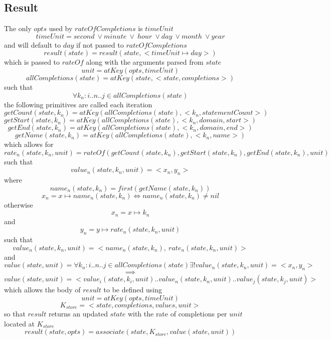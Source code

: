 \documentclass[../main.tex]{subfiles}
\begin{document}
\subsection{Result}
The only $opts$ used by $rateOfCompletions$ is $timeUnit$
$$timeUnit = second \ \lor minute \ \lor \ hour \ \lor day \ \lor month \ \lor year$$
and will default to $day$ if not passed to $rateOfCompletions$
$$result(state) = result(state, <timeUnit \mapsto day>)$$
which is passed to $rateOf$ along with the arguments parsed from $state$
$$unit = atKey(opts, timeUnit)$$
$$allCompletions(state) = atKey(state, <state, completions>)$$
such that
$$\forall k_{n} : i..n..j \in allCompletions(state)$$
the following primitives are called each iteration
$$getCount(state, k_{n}) = atKey(allCompletions(state), <k_{n}, statementCount>)$$
$$getStart(state, k_{n}) = atKey(allCompletions(state), <k_{n}, domain, start>)$$
$$getEnd(state, k_{n}) = atKey(allCompletions(state), <k_{n}, domain, end>)$$
$$getName(state, k_{n}) = atKey(allCompletions(state), <k_{n}, name>) $$
which allows for
$$rate_{n}(state, k_{n}, unit) = rateOf(getCount(state, k_{n}), getStart(state, k_{n}), getEnd(state, k_{n}), unit)$$
such that
$$value_{n}(state, k_{n}, unit) = <x_{n}, y_{n}>$$
where
$$name_{n}(state, k_{n}) = first(getName(state, k_{n}))$$
$$x_{n} = x \mapsto name_{n}(state, k_{n}) \iff name_{n}(state, k_{n}) \not = nil$$
otherwise
$$x_{n} = x \mapsto k_{n}$$
and
$$y_{n} = y \mapsto rate_{n}(state, k_{n}, unit)$$
such that
$$value_{n}(state, k_{n}, unit) = <name_{n}(state, k_{n}), \ rate_{n}(state, k_{n}, unit)>$$
and
$$value(state, unit) = \forall k_{n} : i..n..j \in allCompletions(state) \exists! value_{n}(state, k_{n}, unit) = <x_{n}, y_{n}>$$
$$\implies$$
$$value(state, unit) = <value_{i}(state, k_{i}, unit)..value_{n}(state, k_{n}, unit)..value_{j}(state, k_{j}, unit)>$$
which allows the body of $result$ to be defined using
$$unit = atKey(opts, timeUnit)$$
$$K_{store} = <state, completions, values, unit>$$
so that $result$ returns an updated $state$ with the rate of completions per $unit$ located at $K_{store}$
$$result(state, opts) = associate(state, K_{store}, value(state, unit))$$
\end{document}
